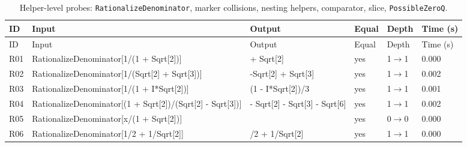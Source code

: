 \begin{longtable}{@{}p{}>{\ttfamily\footnotesize\raggedright\arraybackslash}p{}>{\ttfamily\footnotesize\raggedright\arraybackslash}p{}p{}p{}p{}@{}}
\caption{Helper-level probes: \texttt{RationalizeDenominator}, marker collisions, nesting helpers, comparator, slice, \texttt{PossibleZeroQ}.}\label{tab:helpR}\\
\toprule ID & Input & Output & Equal & Depth & Time (s)\\\midrule\endfirsthead
\toprule ID & Input & Output & Equal & Depth & Time (s)\\\midrule\endhead
\bottomrule\endfoot
R01 & RationalizeDenominator[\allowbreak{}1/\allowbreak{}(\allowbreak{}1 +\allowbreak{} Sqrt[\allowbreak{}2]\allowbreak{})\allowbreak{}]\allowbreak{} & -1 +\allowbreak{} Sqrt[\allowbreak{}2]\allowbreak{} & yes & 1$\to$1 & 0.000\\
R02 & RationalizeDenominator[\allowbreak{}1/\allowbreak{}(\allowbreak{}Sqrt[\allowbreak{}2]\allowbreak{} +\allowbreak{} Sqrt[\allowbreak{}3]\allowbreak{})\allowbreak{}]\allowbreak{} & -Sqrt[\allowbreak{}2]\allowbreak{} +\allowbreak{} Sqrt[\allowbreak{}3]\allowbreak{} & yes & 1$\to$1 & 0.002\\
R03 & RationalizeDenominator[\allowbreak{}1/\allowbreak{}(\allowbreak{}1 +\allowbreak{} I*\allowbreak{}Sqrt[\allowbreak{}2]\allowbreak{})\allowbreak{}]\allowbreak{} & (\allowbreak{}1 -\allowbreak{} I*\allowbreak{}Sqrt[\allowbreak{}2]\allowbreak{})\allowbreak{}/\allowbreak{}3 & yes & 1$\to$1 & 0.001\\
R04 & RationalizeDenominator[\allowbreak{}(\allowbreak{}1 +\allowbreak{} Sqrt[\allowbreak{}2]\allowbreak{})\allowbreak{}/\allowbreak{}(\allowbreak{}Sqrt[\allowbreak{}2]\allowbreak{} -\allowbreak{} Sqrt[\allowbreak{}3]\allowbreak{})\allowbreak{}]\allowbreak{} & -2 -\allowbreak{} Sqrt[\allowbreak{}2]\allowbreak{} -\allowbreak{} Sqrt[\allowbreak{}3]\allowbreak{} -\allowbreak{} Sqrt[\allowbreak{}6]\allowbreak{} & yes & 1$\to$1 & 0.002\\
R05 & RationalizeDenominator[\allowbreak{}x/\allowbreak{}(\allowbreak{}1 +\allowbreak{} Sqrt[\allowbreak{}2]\allowbreak{})\allowbreak{}]\allowbreak{} & 0 & yes & 0$\to$0 & 0.000\\
R06 & RationalizeDenominator[\allowbreak{}1/\allowbreak{}2 +\allowbreak{} 1/\allowbreak{}Sqrt[\allowbreak{}2]\allowbreak{}]\allowbreak{} & 1/\allowbreak{}2 +\allowbreak{} 1/\allowbreak{}Sqrt[\allowbreak{}2]\allowbreak{} & yes & 1$\to$1 & 0.000\\

\end{longtable}
